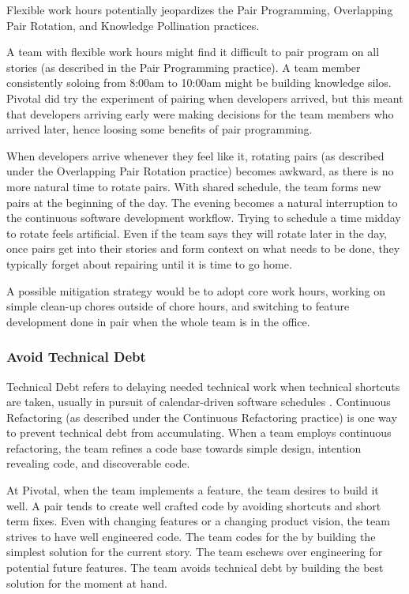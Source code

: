 \begin{table}[]
Flexible work hours potentially jeopardizes the Pair Programming, Overlapping Pair Rotation, and Knowledge Pollination practices. 

A team with flexible work hours might find it difficult to pair program on all stories (as described in the Pair Programming practice). A team member consistently soloing from 8:00am to 10:00am might be building knowledge silos. Pivotal did try the experiment of pairing when developers arrived, but this meant that developers arriving early were making decisions for the team members who arrived later, hence loosing some benefits of pair programming. 

When developers arrive whenever they feel like it, rotating pairs (as described under the Overlapping Pair Rotation practice) becomes awkward, as there is no more natural time to rotate pairs. With shared schedule, the team forms new pairs at the beginning of the day. The evening becomes a natural interruption to the continuous software development workflow. Trying to schedule a time midday to rotate feels artificial. Even if the team says they will rotate later in the day, once pairs get into their stories and form context on what needs to be done, they typically forget about repairing until it is time to go home.

A possible mitigation strategy would be to adopt core work hours, working on simple clean-up chores outside of chore hours, and switching to feature development done in pair when the whole team is in the office. 

\subsubsection{Avoid Technical Debt}

Technical Debt refers to delaying needed technical work when technical shortcuts are taken, usually in pursuit of calendar-driven software schedules \cite{McConnellTechnicalDebt}.  Continuous Refactoring (as described under the Continuous Refactoring practice) is one way to prevent technical debt from accumulating. When a team employs continuous refactoring, the team refines a code base towards simple design, intention revealing code, and discoverable code. 

At Pivotal, when the team implements a feature, the team desires to build it well. A pair tends to create well crafted code by avoiding shortcuts and short term fixes. Even with changing features or a changing product vision, the team strives to have well engineered code. The team codes for the  by building the simplest solution for the current story. The team eschews over engineering for potential future features. The team avoids technical debt by building the best solution for the moment at hand.  


\end{table}
